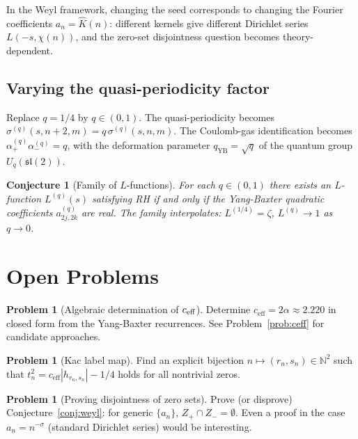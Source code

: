 \documentclass[%
 aip,
 amsmath,amssymb,
 reprint,%
]{revtex4-1}
\theoremstyle{plain}
\newtheorem{conjecture}{Conjecture}[section]
\theoremstyle{definition}
\newtheorem{problem}[theorem]{Problem}
\newcommand{\N}{\mathbb{N}}
\begin{document}
In the Weyl framework, changing the seed corresponds to changing the Fourier
coefficients $a_n = \hat{K}(n)$: different kernels give different Dirichlet
series $L(-s, \chi(n))$, and the zero-set disjointness question becomes
theory-dependent.

\subsection{Varying the quasi-periodicity factor}

Replace $q = 1/4$ by $q \in (0,1)$. The quasi-periodicity becomes
$\sigma^{(q)}(s,n+2,m) = q\,\sigma^{(q)}(s,n,m)$. The Coulomb-gas identification
becomes $\alpha_+^{(q)}\alpha_-^{(q)} = q$, with the deformation parameter
$q_{\mathrm{YB}} = \sqrt{q}$ of the quantum group $U_q(\mathfrak{sl}(2))$.

\begin{conjecture}[Family of $L$-functions]\label{conj:qfamily}
For each $q \in (0,1)$ there exists an $L$-function $L^{(q)}(s)$ satisfying RH
if and only if the Yang-Baxter quadratic coefficients $a^{(q)}_{2j,2k}$ are real.
The family interpolates: $L^{(1/4)} = \zeta$, $L^{(q)} \to 1$ as $q \to 0$.
\end{conjecture}

\section{Open Problems}
\label{sec:open}

\begin{problem}[Algebraic determination of $c_{\rm eff}$]
Determine $c_{\mathrm{eff}} = 2\alpha \approx 2.220$ in closed form from the
Yang-Baxter recurrences.  See Problem~\ref{prob:ceff} for candidate approaches.
\end{problem}

\begin{problem}[Kac label map]
Find an explicit bijection $n \mapsto (r_n, s_n) \in \N^2$ such that
$t_n^2 = c_{\mathrm{eff}}|h_{r_n,s_n}| - 1/4$ holds for all nontrivial zeros.
\end{problem}

\begin{problem}[Proving disjointness of zero sets]
Prove (or disprove) Conjecture~\ref{conj:weyl}: for generic $\{a_n\}$,
$Z_+ \cap Z_- = \emptyset$. Even a proof in the case $a_n = n^{-\sigma}$
(standard Dirichlet series) would be interesting.
\end{problem}
\end{document}

